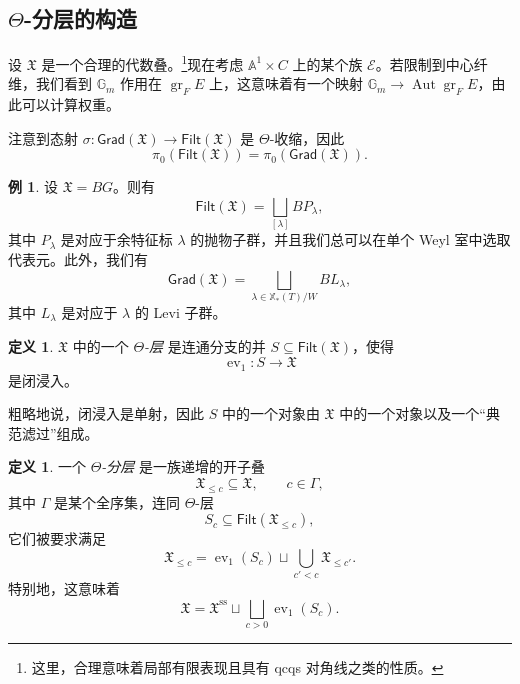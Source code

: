 \documentclass{amsart}
\theoremstyle{definition}
\newtheorem{defn}[thm]{定义}
\newtheorem{exm}[thm]{例}
\theoremstyle{remark}
\theoremstyle{plain}
\theoremstyle{definition}
\theoremstyle{remark}
\newcommand{\A}{\mathbb{A}}
\newcommand{\G}{\mathbb{G}}
\newcommand{\mc}[1]{\mathcal{#1}}
\newcommand{\mf}[1]{\mathfrak{#1}}
\newcommand{\mr}[1]{\mathrm{#1}}
\newcommand{\on}[1]{\operatorname{#1}}
\newcommand{\ms}[1]{\mathsf{#1}}
\newcommand{\1}{\mathbf{1}}
\newcommand{\2}{\mathbf{2}}
\newcommand{\3}{\mathbf{3}}
\DeclareMathOperator{\Aut}{Aut}
\DeclareMathOperator{\ev}{ev}
\begin{document}
\subsection{\(\Theta\)-分层的构造}%
\label{sub:Construction of Theta-stratifications}

设 \(\mf{X}\) 是一个合理的代数叠。\footnote{这里，合理意味着局部有限表现且具有 qcqs 对角线之类的性质。}现在考虑 \(\A^1 \times C\) 上的某个族 \(\mc{E}\)。若限制到中心纤维，我们看到 \(\G_m\) 作用在 \(\on{gr}_F E\) 上，这意味着有一个映射 \(\G_m \to \Aut \on{gr}_F E\)，由此可以计算权重。

注意到态射 \(\sigma \colon \ms{Grad}(\mf{X}) \to \ms{Filt}(\mf{X})\) 是 \(\Theta\)-收缩，因此
\[ \pi_0(\ms{Filt}(\mf{X})) = \pi_0(\ms{Grad}(\mf{X})). \]

\begin{exm}
    设 \(\mf{X} = BG\)。则有
    \[\ms{Filt}(\mf{X}) = \bigsqcup_{[\lambda]} B P_{\lambda}, \]
    其中 \(P_{\lambda}\) 是对应于余特征标 \(\lambda\) 的抛物子群，并且我们总可以在单个 Weyl 室中选取代表元。此外，我们有
    \[ \ms{Grad}(\mf{X}) = \bigsqcup_{\lambda \in \mathbb{X}_*(T)/W} B L_{\lambda}, \]
    其中 \(L_{\lambda}\) 是对应于 \(\lambda\) 的 Levi 子群。
\end{exm}

\begin{defn}
    \(\mf{X}\) 中的一个 \textit{\(\Theta\)-层} 是连通分支的并 \(S \subseteq \ms{Filt}(\mf{X})\)，使得
    \[ \ev_1 \colon S \to \mf{X} \]
    是闭浸入。
\end{defn}

粗略地说，闭浸入是单射，因此 \(S\) 中的一个对象由 \(\mf{X}\) 中的一个对象以及一个“典范滤过”组成。

\begin{defn}
    一个 \textit{\(\Theta\)-分层} 是一族递增的开子叠
    \[ \mf{X}_{\leq c} \subseteq \mf{X}, \qquad c \in \Gamma, \]
    其中 \(\Gamma\) 是某个全序集，连同 \(\Theta\)-层
    \[ S_c \subseteq \ms{Filt}(\mf{X}_{\leq c}), \]
    它们被要求满足
    \[ \mf{X}_{\leq c} = \ev_1(S_c) \sqcup \bigcup_{c' < c} \mf{X}_{\leq c'}. \]
    特别地，这意味着
    \[ \mf{X} = \mf{X}^{\mr{ss}} \sqcup \bigsqcup_{c > 0} \ev_1(S_c). \]
\end{defn}
\end{document}
